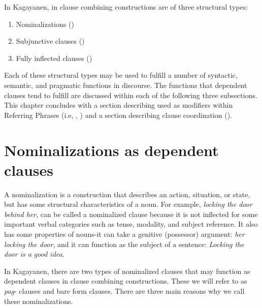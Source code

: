 In Kagayanen,  in clause combining constructions are of three structural types:

\begin{enumerate}
\item Nominalizations ()
\item  Subjunctive clauses ()
\item Fully inflected clauses ()
\end{enumerate}

Each of these structural types may be used to fulfill a number of syntactic, semantic, and pragmatic functions in discourse. The functions that dependent clauses tend to fulfill are discussed within each of the following three subsections. This chapter concludes with a section describing  used as modifiers within Referring Phrases (i.e, , ) and a section describing clause coordination ().

\section{Nominalizations as dependent clauses}
\label{bkm:Ref474473730} \label{sec:nominalizationsasdependentclauses}

A nominalization is a construction that describes an action, situation, or state, but has some structural characteristics of a noun. For example,  \textit{locking the door behind her}, can be called a nominalized clause because it is not inflected for some important verbal categories such as tense, modality, and subject reference. It also has some properties of nouns-it can take a genitive (possessor) argument: \textit{her locking the door}, and it can function as the subject of a sentence: \textit{Locking the door is a good idea}.

In Kagayanen, there are two types of nominalized clauses that may function as dependent clauses in clause combining constructions. These we will refer to as \textit{pag}{}- clauses and bare form clauses. There are three main reasons why we call these nominalizations.

